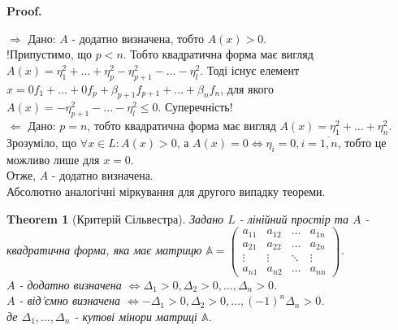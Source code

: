 \documentclass[a4paper, 10pt]{article}
\makeatletter
\def\rightproof{$\boxed{\Rightarrow}$ }
\def\leftproof{$\boxed{\Leftarrow}$ }
\theoremstyle{theoremdd}
\newtheorem{theorem}{Theorem}[subsection]
\renewenvironment{proof}[1][Proof.\\]{\par
\pushQED{\hfill \qed}%
\normalfont \topsep6\p@\@plus6\p@\relax
\trivlist
\item\relax
{\bfseries
#1\@addpunct{.}}\hspace\labelsep\ignorespaces
}{%
\popQED\endtrivlist\@endpefalse
}
\makeatother
\begin{document}
\begin{proof}
\rightproof Дано: $A$ - додатно визначена, тобто $A(x) > 0$.\\
!Припустимо, що $p < n$. Тобто квадратична форма має вигляд $A(x) = \eta_1^2 + \dots + \eta_p^2 - \eta_{p+1}^2 - \dots - \eta_l^2$. Тоді існує елемент $x = 0f_1 + \dots + 0f_p + \beta_{p+1}f_{p+1} + \dots + \beta_n f_n$, для якого $A(x) = -\eta_{p+1}^2 - \dots - \eta_l^2 \leq 0$. Суперечність!
\bigskip \\
\leftproof Дано: $p = n$, тобто квадратична форма має вигляд $A(x) = \eta_1^2 + \dots + \eta_n^2$. Зрозуміло, що $\forall x \in L: A(x) > 0$, а $A(x) = 0 \iff \eta_i = 0, i = \overline{1,n}$, тобто це можливо лише для $x = 0$. \\
Отже, $A$ - додатно визначена.
\bigskip \\
Абсолютно аналогічні міркування для другого випадку теореми.
\end{proof}

\begin{theorem}[Критерій Сільвестра]
Задано $L$ - лінійний простір та $A$ - квадратична форма, яка має матрицю $\mathbb{A} = \begin{pmatrix}
a_{11} & a_{12} & \dots & a_{1n} \\
a_{21} & a_{22} & \dots & a_{2n} \\
\vdots & \vdots & \ddots & \vdots \\
a_{n1} & a_{n2} & \dots & a_{nn}
\end{pmatrix}$.\\
$A$ - додатно визначена $\iff \Delta_1 > 0, \Delta_2 > 0, \dots, \Delta_n > 0$.\\
$A$ - від'ємно визначена $\iff -\Delta_1 > 0, \Delta_2 > 0, \dots, (-1)^n\Delta_n > 0$.\\
де $\Delta_1,\dots,\Delta_n$ - кутові мінори матриці $\mathbb{A}$.
\end{theorem}
\end{document}
